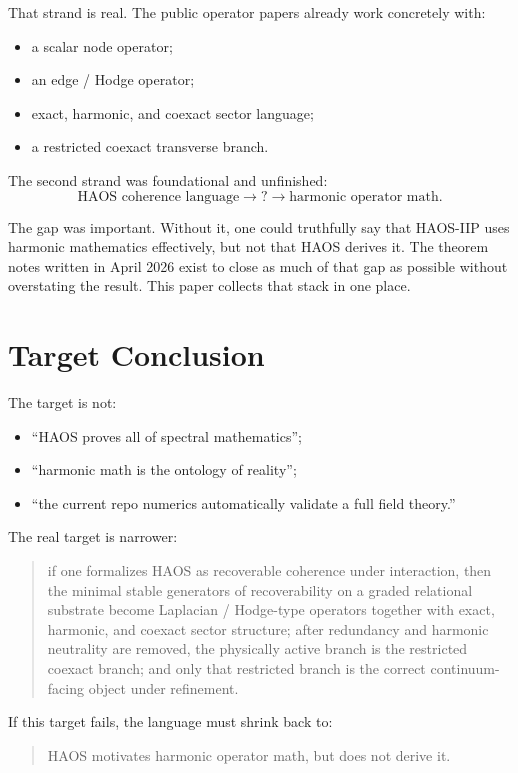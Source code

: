 \documentclass[11pt]{article}
\begin{document}
That strand is real. The public operator papers already work concretely with:
\begin{itemize}
\item a scalar node operator;
\item an edge / Hodge operator;
\item exact, harmonic, and coexact sector language;
\item a restricted coexact transverse branch.
\end{itemize}

The second strand was foundational and unfinished:
\[
\text{HAOS coherence language}
\to
?
\to
\text{harmonic operator math}.
\]

The gap was important. Without it, one could truthfully say that HAOS-IIP uses harmonic mathematics effectively, but not that HAOS derives it. The theorem notes written in April 2026 exist to close as much of that gap as possible without overstating the result. This paper collects that stack in one place.

\section{Target Conclusion}

The target is not:
\begin{itemize}
\item ``HAOS proves all of spectral mathematics'';
\item ``harmonic math is the ontology of reality'';
\item ``the current repo numerics automatically validate a full field theory.''
\end{itemize}

The real target is narrower:
\begin{quote}
if one formalizes HAOS as recoverable coherence under interaction, then the minimal stable generators of recoverability on a graded relational substrate become Laplacian / Hodge-type operators together with exact, harmonic, and coexact sector structure; after redundancy and harmonic neutrality are removed, the physically active branch is the restricted coexact branch; and only that restricted branch is the correct continuum-facing object under refinement.
\end{quote}

If this target fails, the language must shrink back to:
\begin{quote}
HAOS motivates harmonic operator math, but does not derive it.
\end{quote}
\end{document}
